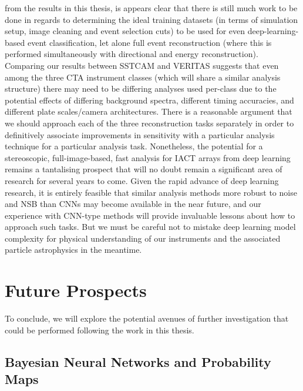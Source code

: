 from the results in this thesis, is appears clear that there is still much work to be done in regards to determining the ideal training datasets (in terms of simulation setup, image cleaning and event selection cuts) to be used for even deep-learning-based event classification, let alone full event reconstruction (where this is performed simultaneously with directional and energy reconstruction). Comparing our results between SSTCAM and VERITAS suggests that even among the three CTA instrument classes (which will share a similar analysis structure) there may need to be differing analyses used per-class due to the potential effects of differing background spectra, different timing accuracies, and different plate scales/camera architectures. There is a reasonable argument that we should approach each of the three reconstruction tasks separately in order to definitively associate improvements in sensitivity with a particular analysis technique for a particular analysis task. Nonetheless, the potential for a stereoscopic, full-image-based, fast analysis for IACT arrays from deep learning remains a tantalising prospect that will no doubt remain a significant area of research for several years to come. Given the rapid advance of deep learning research, it is entirely feasible that similar analysis methods more robust to noise and NSB than CNNs may become available in the near future, and our experience with CNN-type methods will provide invaluable lessons about how to approach such tasks. But we must be careful not to mistake deep learning model complexity for physical understanding of our instruments and the associated particle astrophysics in the meantime.

\section{Future Prospects}
To conclude, we will explore the potential avenues of further investigation that could be performed following the work in this thesis.

\subsection{Bayesian Neural Networks and Probability Maps}

